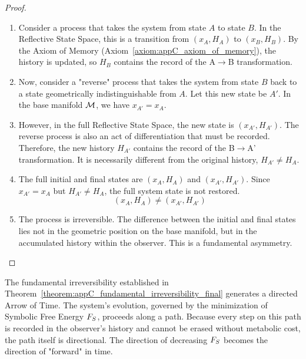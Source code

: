 \begin{proof}
\begin{enumerate}
    \item Consider a process that takes the system from state \(A\) to state \(B\). In the Reflective State Space, this is a transition from \((x_A, H_A)\) to \((x_B, H_B)\). By the Axiom of Memory (Axiom~\ref{axiom:appC_axiom_of_memory}), the history is updated, so \(H_B\) contains the record of the A\(\to\)B transformation.

    \item Now, consider a "reverse" process that takes the system from state \(B\) back to a state geometrically indistinguishable from \(A\). Let this new state be \(A'\). In the base manifold \(\mathcal{M}\), we have \(x_{A'} = x_A\).

    \item However, in the full Reflective State Space, the new state is \((x_{A'}, H_{A'})\). The reverse process is also an act of differentiation that must be recorded. Therefore, the new history \(H_{A'}\) contains the record of the B\(\to\)A' transformation. It is necessarily different from the original history, \(H_{A'} \neq H_A\).

    \item The full initial and final states are \((x_A, H_A)\) and \((x_{A'}, H_{A'})\). Since \(x_{A'} = x_A\) but \(H_{A'} \neq H_A\), the full system state is not restored.
    \[
    (x_A, H_A) \neq (x_{A'}, H_{A'})
    \]
    \item The process is irreversible. The difference between the initial and final states lies not in the geometric position on the base manifold, but in the accumulated history within the observer. This is a fundamental asymmetry.
\end{enumerate}
\end{proof}

\begin{corollary}
\label{corollary:appC_emergence_of_time_arrow_final}
The fundamental irreversibility established in Theorem~\ref{theorem:appC_fundamental_irreversibility_final} generates a directed Arrow of Time. The system's evolution, governed by the minimization of Symbolic Free Energy \(F_S\), proceeds along a path. Because every step on this path is recorded in the observer's history and cannot be erased without metabolic cost, the path itself is directional. The direction of decreasing \(F_S\) becomes the direction of "forward" in time.
\end{corollary}

